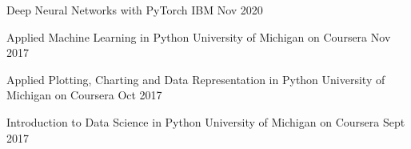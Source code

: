 

\begin{cvhonors}

  \cvhonor
    {Deep Neural Networks with PyTorch} %
    {IBM} %
    {} %
    {Nov 2020} %

  \cvhonor
    {Applied Machine Learning in Python} %
    {University of Michigan on Coursera} %
    {} %
    {Nov 2017} %

  \cvhonor
    {Applied Plotting, Charting and Data Representation in Python} %
    {University of Michigan on Coursera} %
    {} %
    {Oct 2017} %

  \cvhonor
    {Introduction to Data Science in Python} %
    {University of Michigan on Coursera} %
    {} %
    {Sept 2017} %
  
\end{cvhonors}
